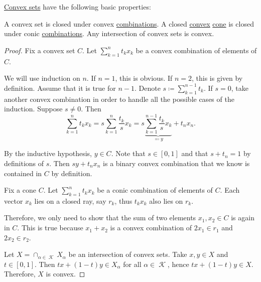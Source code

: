\begin{proposition}\label{thm:def:convex_set/properties}
  \hyperref[def:convex_set]{Convex sets} have the following basic properties:

  \begin{thmenum}
     A convex set is closed under convex \hyperref[def:linear_combination/convex]{combinations}.
     A closed \hyperref[def:convex_set]{convex} \hyperref[def:geometric_cone]{cone} is closed under conic \hyperref[def:linear_combination/conic]{combinations}.
     Any intersection of convex sets is convex.
  \end{thmenum}
\end{proposition}
\begin{proof}
   Fix a convex set \( C \). Let \( \sum_{k=1}^n t_k x_k \) be a convex combination of elements of \( C \).

  We will use induction on \( n \). If \( n = 1 \), this is obvious. If \( n = 2 \), this is given by definition. Assume that it is true for \( n - 1 \). Denote \( s \coloneqq \sum_{k=1}^{n-1} t_k \). If \( s = 0 \), take another convex combination in order to handle all the possible cases of the induction. Suppose \( s \neq 0 \). Then
  \begin{equation*}
    \sum_{k=1}^n t_k x_k
    =
    s \sum_{k=1}^n \frac {t_k} s x_k
    =
    s \underbrace{\sum_{k=1}^{n-1} \frac {t_k} s x_k}_{\eqqcolon y} + t_n x_n.
  \end{equation*}

  By the inductive hypothesis, \( y \in C \). Note that \( s \in [0, 1] \) and that \( s + t_n = 1 \) by definitions of \( s \). Then \( s y + t_n x_n \) is a binary convex combination that we know is contained in \( C \) by definition.

   Fix a cone \( C \). Let \( \sum_{k=1}^n t_k x_k \) be a conic combination of elements of \( C \). Each vector \( x_k \) lies on a closed ray, say \( r_k \), thus \( t_k x_k \) also lies on \( r_k \).

  Therefore, we only need to show that the sum of two elements \( x_1, x_2 \in C \) is again in \( C \). This is true because \( x_1 + x_2 \) is a convex combination of \( 2x_1 \in r_1 \) and \( 2x_2 \in r_2 \).

   Let \( X = \cap_{\alpha \in \mscrK} X_\alpha \) be an intersection of convex sets. Take \( x, y \in X \) and \( t \in [0, 1] \). Then \( tx + (1-t)y \in X_\alpha \) for all \( \alpha \in \mscrK \), hence \( tx + (1-t)y \in X \). Therefore, \( X \) is convex.
\end{proof}

